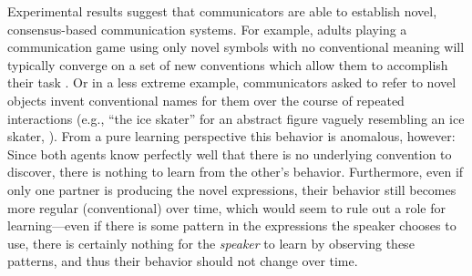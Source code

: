 \documentclass{article} %
\begin{document}
Experimental results suggest that communicators are able to establish
novel, consensus-based communication systems. For example, adults
playing a communication game using only novel symbols with no
conventional meaning will typically converge on a set of new
conventions which allow them to accomplish their task
\cite{galantucci2005}. Or in a less extreme example, communicators
asked to refer to novel objects invent conventional names for them
over the course of repeated interactions (e.g., ``the ice skater'' for
an abstract figure vaguely resembling an ice skater,
\cite{clark1986}). From a pure learning perspective this behavior is anomalous,
however: Since both agents know perfectly well that there is no
underlying convention to discover, there is nothing to learn from the
other's behavior. Furthermore, even if only one partner is producing
the novel expressions, their behavior still becomes more regular
(conventional) over time, which would seem to rule out a role for
learning---even if there is some pattern in the expressions the
speaker chooses to use, there is certainly nothing for the
\textit{speaker} to learn by observing these patterns, and thus their
behavior should not change over time.
\end{document}
